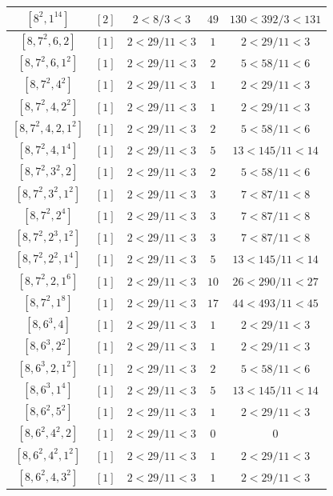 \documentclass{article}%
\begin{document}
\begin{center}
\begin{longtable}{||c|c|c|c|c||}
$[8^{2}, 1^{14}]$ & $[2]$ & $2 < 8/3 < 3$ & $49$ & $130 < 392/3 < 131$ \\ \hline 
$[8, 7^{2}, 6, 2]$ & $[1]$ & $2 < 29/11 < 3$ & $1$ & $2 < 29/11 < 3$ \\ \hline 
$[8, 7^{2}, 6, 1^{2}]$ & $[1]$ & $2 < 29/11 < 3$ & $2$ & $5 < 58/11 < 6$ \\ \hline 
$[8, 7^{2}, 4^{2}]$ & $[1]$ & $2 < 29/11 < 3$ & $1$ & $2 < 29/11 < 3$ \\ \hline 
$[8, 7^{2}, 4, 2^{2}]$ & $[1]$ & $2 < 29/11 < 3$ & $1$ & $2 < 29/11 < 3$ \\ \hline 
$[8, 7^{2}, 4, 2, 1^{2}]$ & $[1]$ & $2 < 29/11 < 3$ & $2$ & $5 < 58/11 < 6$ \\ \hline 
$[8, 7^{2}, 4, 1^{4}]$ & $[1]$ & $2 < 29/11 < 3$ & $5$ & $13 < 145/11 < 14$ \\ \hline 
$[8, 7^{2}, 3^{2}, 2]$ & $[1]$ & $2 < 29/11 < 3$ & $2$ & $5 < 58/11 < 6$ \\ \hline 
$[8, 7^{2}, 3^{2}, 1^{2}]$ & $[1]$ & $2 < 29/11 < 3$ & $3$ & $7 < 87/11 < 8$ \\ \hline 
$[8, 7^{2}, 2^{4}]$ & $[1]$ & $2 < 29/11 < 3$ & $3$ & $7 < 87/11 < 8$ \\ \hline 
$[8, 7^{2}, 2^{3}, 1^{2}]$ & $[1]$ & $2 < 29/11 < 3$ & $3$ & $7 < 87/11 < 8$ \\ \hline 
$[8, 7^{2}, 2^{2}, 1^{4}]$ & $[1]$ & $2 < 29/11 < 3$ & $5$ & $13 < 145/11 < 14$ \\ \hline 
$[8, 7^{2}, 2, 1^{6}]$ & $[1]$ & $2 < 29/11 < 3$ & $10$ & $26 < 290/11 < 27$ \\ \hline 
$[8, 7^{2}, 1^{8}]$ & $[1]$ & $2 < 29/11 < 3$ & $17$ & $44 < 493/11 < 45$ \\ \hline 
$[8, 6^{3}, 4]$ & $[1]$ & $2 < 29/11 < 3$ & $1$ & $2 < 29/11 < 3$ \\ \hline 
$[8, 6^{3}, 2^{2}]$ & $[1]$ & $2 < 29/11 < 3$ & $1$ & $2 < 29/11 < 3$ \\ \hline 
$[8, 6^{3}, 2, 1^{2}]$ & $[1]$ & $2 < 29/11 < 3$ & $2$ & $5 < 58/11 < 6$ \\ \hline 
$[8, 6^{3}, 1^{4}]$ & $[1]$ & $2 < 29/11 < 3$ & $5$ & $13 < 145/11 < 14$ \\ \hline 
$[8, 6^{2}, 5^{2}]$ & $[1]$ & $2 < 29/11 < 3$ & $1$ & $2 < 29/11 < 3$ \\ \hline 
$[8, 6^{2}, 4^{2}, 2]$ & $[1]$ & $2 < 29/11 < 3$ & $0$ & $0$ \\ \hline 
$[8, 6^{2}, 4^{2}, 1^{2}]$ & $[1]$ & $2 < 29/11 < 3$ & $1$ & $2 < 29/11 < 3$ \\ \hline 
$[8, 6^{2}, 4, 3^{2}]$ & $[1]$ & $2 < 29/11 < 3$ & $1$ & $2 < 29/11 < 3$ \\ \hline 

\end{longtable}
\end{center}
\end{document}
